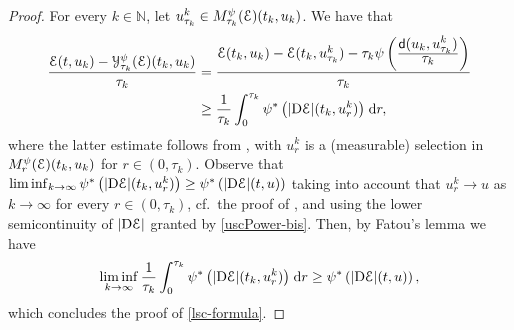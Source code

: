 \documentclass[a4paper,10pt,reqno]{amsart} %
\newcommand{\N}{\mathbb{N}}
\numberwithin{equation}{section}
\def\calY{{\mathcal Y}} \def\calZ{{\mathcal Z}}
\def\dd{\;\!\mathrm{d}} %
\newcommand{\md}[2]{\mathsf{d}(#1,#2)}
\newcommand{\RRR}{\color{red}}
\begin{document}
\begin{proof}
For every $k\in\N$, let  $u_{\tau_k}^k \in M_{\tau_k}^\psi({\mathcal E})(t_k,u_k)$. We have that 
\[
\begin{aligned}
 \frac{\calE(t,u_k) - \calY_{\tau_k}^\psi(\calE)(t_k,u_k)} {\tau_k} & =  \frac{\calE(t_k,u_k) -  \calE(t_k,u_{\tau_k}^k) - \tau_k \psi \left( \frac{\displaystyle \md{u_k}{u_{\tau_k}^k}}{\displaystyle \tau_k} \right)  } {\tau_k}
 \\
  &  \geq  \frac1{\tau_k} \int_0^{\tau_k} \psi^*  \left(|\mathrm{D} \calE|(t_k,u_r^k) \right) \dd r, 
\end{aligned}
\]
where the latter  estimate  follows from \cite[Lemma 4.5]{RMS08}, with
 $u_r^k$ is a (measurable) selection in $M_{r}^\psi({\mathcal E})(t_k,u_k)$ for  $r\in (0,\tau_k)$. Observe that  
 $\liminf_{k\to\infty}  \psi^*  \left(|\mathrm{D} {\mathcal E}|(t_k,u_r^k) \right) \geq  \psi^*  \left(|\mathrm{D} {\mathcal E}|(t,u) \right) $ taking into account that 
 $u_r^k\to u$ as $k\to\infty$  for every $r\in (0,\tau_k)$, cf.\ the proof of 
  \cite[Lemma 4.5]{RMS08},
  and using the lower semicontinuity of $|\mathrm{D}{\mathcal E}|$ granted by \eqref{uscPower-bis}.  Then,  by Fatou's lemma we have 
  \[
  \liminf_{k\to\infty}  \frac1{\tau_k} \int_0^{\tau_k} \psi^*  \left(|\mathrm{D} \calE|(t_k,u_r^k) \right) \dd r \geq  \psi^* \left(|\mathrm{D} \calE|(t,u) \right),
  \]
  which concludes the proof of \eqref{lsc-formula}. 
\end{proof}







{\small 


}
\end{document}
